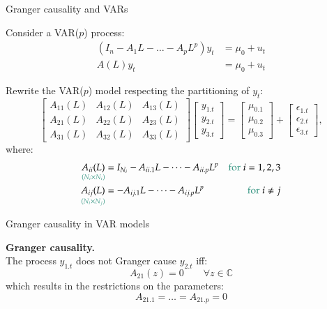 \documentclass[notes,blackandwhite,mathsans,usenames,dvipsnames]{beamer}
\begin{document}
\begin{frame} {Granger causality and VARs}
\small

{\color{mcxs2}Consider a} VAR($p$) {\color{mcxs2}process:}
\begin{align*} 
(I_n - A_1L - \dots - A_pL^p) y_t &= \mu_0 + u_t \\
A(L) y_t &= \mu_0 + u_t 
\end{align*} 

{\color{mcxs1}Rewrite} {\color{mcxs2}the VAR($p$) model respecting the partitioning of $y_t$:}
$$ \begin{bmatrix} A_{11}(L) & A_{12}(L) & A_{13}(L) \\ A_{21}(L) & A_{22}(L) & A_{23}(L) \\ A_{31}(L) & A_{32}(L) & A_{33}(L)\end{bmatrix}\begin{bmatrix} y_{1.t} \\ y_{2.t} \\ y_{3.t} \end{bmatrix} = \begin{bmatrix} \mu_{0.1} \\ \mu_{0.2} \\ \mu_{0.3} \end{bmatrix} +  \begin{bmatrix} \epsilon_{1.t} \\ \epsilon_{2.t} \\ \epsilon_{3.t} \end{bmatrix}, $$
{\color{mcxs2}where:}
\begin{align*}
\underset{\color{mcxs2}(N_i\times N_i)}{A_{ii}(L)} &= I_{N_i} - A_{ii.1}L - \dots - A_{ii.p}L^p & \text{\color{mcxs2}for } i = 1,2, 3\\
\underset{\color{mcxs2}(N_i\times N_j)}{A_{ij}(L)} &= - A_{ij.1}L - \dots - A_{ij.p}L^p  & \text{\color{mcxs2}for } i\neq j\\
\end{align*}
\end{frame}


\begin{frame}{Granger causality in VAR models}

\small
\textbf{Granger causality.}\\
{\color{mcxs2}The process} $y_{1.t}$ {\color{mcxs2}does} {\color{mcxs1}not Granger cause} $y_{2.t}$ {\color{mcxs2} iff:}
$$ A_{21}(z) = 0 \qquad \forall z\in \mathbb{C} $$
{\color{mcxs2}which results in the restrictions on the parameters:}
$$ A_{21.1} = \dots = A_{21.p} = 0 $$

\end{frame}
\end{document}

